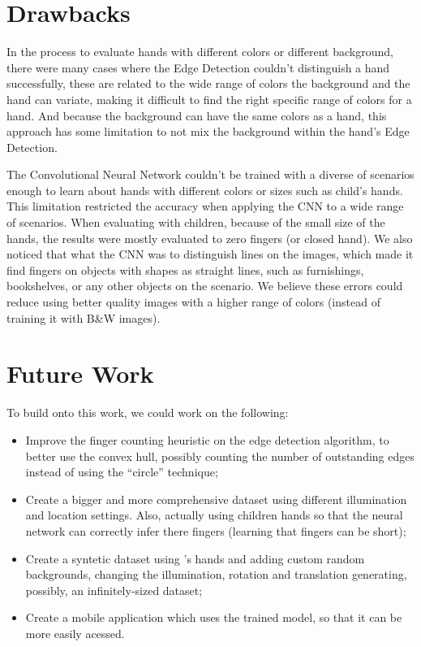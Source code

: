 \documentclass[conference]{IEEEtran}
\begin{document}
\section{Drawbacks}
In the process to evaluate hands with different colors or different background, there were many cases where the Edge Detection couldn't distinguish a hand successfully, these are related to the wide range of colors the background and the hand can variate, making it difficult to find the right specific range of colors for a hand. And because the background can have the same colors as a hand, this approach has some limitation to not mix the background within the hand's Edge Detection.

The Convolutional Neural Network couldn't be trained with a diverse of scenarios enough to learn about hands with different colors or sizes such as child's hands. This limitation restricted the accuracy when applying the CNN to a wide range of scenarios. When evaluating with children, because of the small size of the hands, the results were mostly evaluated to zero fingers (or closed hand). We also noticed that what the CNN was to distinguish lines on the images, which made it find fingers on objects with shapes as straight lines, such as furnishings, bookshelves, or any other objects on the scenario. We believe these errors could reduce using better quality images with a higher range of colors (instead of training it with B\&W images). 

\section{Future Work}
To build onto this work, we could work on the following:

\begin{itemize}
    \item Improve the finger counting heuristic on the edge detection algorithm, to better use the convex hull, possibly counting the number of outstanding edges instead of using the ``circle'' technique;
    \item Create a bigger and more comprehensive dataset using different illumination and location settings. Also, actually using children hands so that the neural network can correctly infer there fingers (learning that fingers can be short);
    \item Create a syntetic dataset using \cite{b7}'s hands and adding custom random backgrounds, changing the illumination, rotation and translation generating, possibly, an infinitely-sized dataset;
    \item Create a mobile application which uses the trained model, so that it can be more easily acessed.
\end{itemize}
\end{document}
